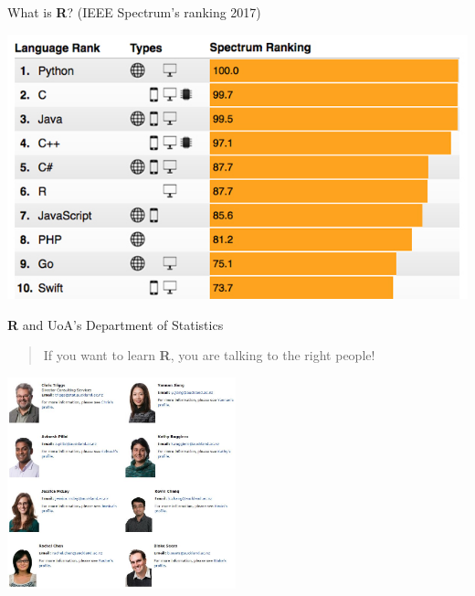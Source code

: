 \documentclass[ignorenonframetext,]{beamer}
\begin{document}
\begin{frame}{What is \textbf{R}? (IEEE Spectrum's ranking 2017)}

\center \includegraphics{Figure/ranking 2017.png}

\end{frame}

\begin{frame}{\textbf{R} and UoA's Department of Statistics}

\begin{quote}
If you want to learn \textbf{R}, you are talking to the right people!
\end{quote}

\center \includegraphics[width=2.60417in]{Figure/groupNew.jpg}

\end{frame}
\end{document}
